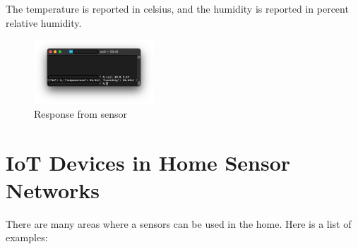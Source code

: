\documentclass[10pt, journal]{IEEEtran} %
\begin{document}
The temperature is reported in celsius, and the humidity is reported in percent relative humidity.

\begin{figure}[htpb]
    \centering
    \includegraphics[width=0.4\textwidth]{images/sensor_response.png}
    \caption{Response from sensor}
    \label{fig:sensor_response}
\end{figure}


\section*{IoT Devices in Home Sensor Networks}

There are many areas where a sensors can be used in the home.
Here is a list of examples:
\end{document}
